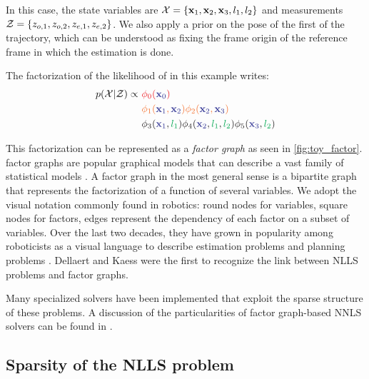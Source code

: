 In this case, the state variables are $\mathcal{X} = \{ {\bf x}_1, {\bf x}_2, {\bf x}_3, l_1, l_2\}$  and measurements $\mathcal{Z} = \{ z_{o,1}, z_{o,2}, z_{e,1}, z_{e,2}\}$.
We also apply a prior on the pose of the first \keyframe of the trajectory, which can be understood as fixing the frame origin of the reference 
frame in which the estimation is done.

The factorization of the likelihood of  in this example writes:
%
\begin{align}
    p(\cX | \cZ) \propto 
    ~&{\color{Red} \phi_0({\color{Blue} \bfx_{0}})} \\ 
    ~&{\color{Orange} \phi_1({\color{Blue} \bfx_1}, {\color{Blue} \bfx_2}) \phi_2({\color{Blue} \bfx_2}, {\color{Blue} \bfx_3})} \\ 
    ~&{\color{Black} \phi_3({\color{Blue} \bfx_1}, {\color{Green} l_1}) \phi_4({\color{Blue} \bfx_2}, {\color{Green} l_1}, {\color{Green} l_2}) \phi_5({\color{Blue} \bfx_3}, {\color{Green} l_2})} \\ 
\end{align}

This factorization can be represented as a \textit{factor graph} as seen in \ref{fig:toy_factor}. 
factor graphs are popular graphical models \cite{koller2009probabilistic} that can describe a vast family of statistical models \cite{loeliger2004introduction}.
A factor graph in the most general sense is a bipartite graph that represents the factorization of a function of several variables. 
We adopt the visual notation commonly found in robotics: round nodes for variables, square nodes for factors, edges represent the dependency 
of each factor on a subset of variables. Over the last two decades, they have grown in popularity among roboticists as a visual language to describe 
estimation problems \cite{dellaert2017factor} and planning problems \cite{dong2016motion}. Dellaert and Kaess \cite{dellaert2006square} were the first to
recognize the link between NLLS problems and factor graphs.

Many specialized solvers \cite{grisetti2011g2o, dellaert2012factor, ila2017slam++} have been implemented that exploit the sparse structure of these 
problems. A discussion of the particularities of factor graph-based NNLS solvers can be found in \cite{dellaert2017factor, sola2017course}.





\subsection{Sparsity of the NLLS problem}

